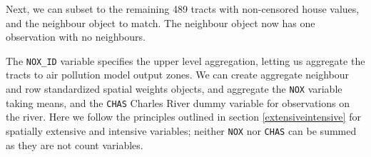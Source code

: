 \documentclass[]{book}
\newenvironment{Shaded}{\begin{snugshade}}{\end{snugshade}}
\newcommand{\DataTypeTok}[1]{\textcolor[rgb]{0.13,0.29,0.53}{#1}}
\newcommand{\DecValTok}[1]{\textcolor[rgb]{0.00,0.00,0.81}{#1}}
\newcommand{\KeywordTok}[1]{\textcolor[rgb]{0.13,0.29,0.53}{\textbf{#1}}}
\newcommand{\NormalTok}[1]{#1}
\newcommand{\OperatorTok}[1]{\textcolor[rgb]{0.81,0.36,0.00}{\textbf{#1}}}
\newcommand{\OtherTok}[1]{\textcolor[rgb]{0.56,0.35,0.01}{#1}}
\newcommand{\StringTok}[1]{\textcolor[rgb]{0.31,0.60,0.02}{#1}}
\begin{document}
Next, we can subset to the remaining 489 tracts with non-censored house values, and the neighbour object to match. The neighbour object now has one observation with no neighbours.

\begin{Shaded}
\end{Shaded}

The \texttt{NOX\_ID} variable specifies the upper level aggregation, letting us aggregate the tracts to air pollution model output zones. We can create aggregate neighbour and row standardized spatial weights objects, and aggregate the \texttt{NOX} variable taking means, and the \texttt{CHAS} Charles River dummy variable for observations on the river. Here we follow the principles outlined in section \ref{extensiveintensive} for spatially extensive and intensive variables; neither \texttt{NOX} nor \texttt{CHAS} can be summed as they are not count variables.
\end{document}
